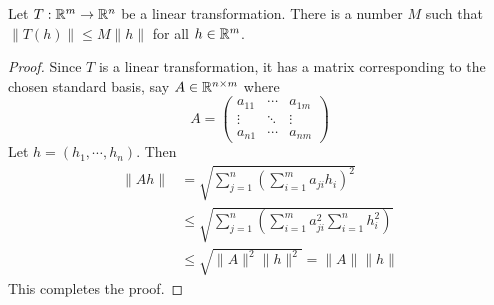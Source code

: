 \begin{lemma}
    Let $T:\mathbb{R}^m\to\mathbb{R}^n$ be a linear transformation. There is a number $M$ such that $\|T(h)\|\le M\|h\|$ for all $h\in\mathbb{R}^m$.
\end{lemma}
\begin{proof}
    Since $T$ is a linear transformation, it has a matrix corresponding to the chosen standard basis, say $A\in\mathbb{R}^{n\times m}$ where 
    \begin{equation*}
        A = 
        \begin{pmatrix}
            a_{11} & \cdots & a_{1m}\\
            \vdots & \ddots & \vdots\\
            a_{n1} & \cdots & a_{nm}
        \end{pmatrix}
    \end{equation*}
    Let $h = (h_1,\cdots,h_n)$. Then 
    \begin{align*}
        \|Ah\| &= \sqrt{\sum_{j = 1}^n\left(\sum_{i = 1}^ma_{ji}h_i\right)^2}\\
        &\le\sqrt{\sum_{j = 1}^n\left(\sum_{i = 1}^ma_{ji}^2\sum_{i = 1}^nh_i^2\right)}\\
        &\le\sqrt{\|A\|^2\|h\|^2} = \|A\|\|h\|
    \end{align*}
    This completes the proof.
\end{proof}